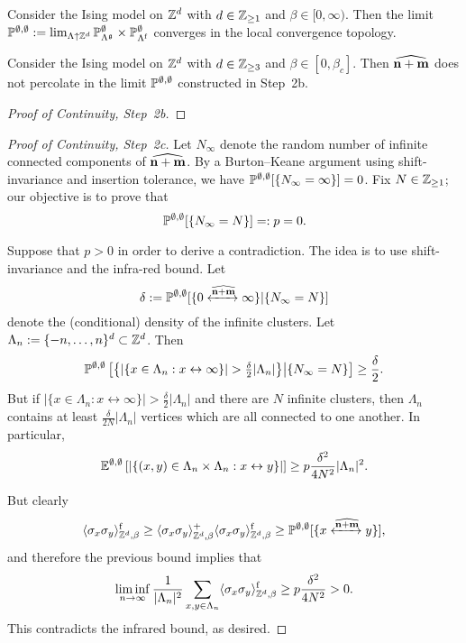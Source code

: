 \begin{lemma}\label{lemma:continuity_step2b}
    Consider the Ising model on $\Z^d$ with $d\in\Z_{\geq 1}$
    and $\beta\in[0,\infty)$.
    Then the limit $\P^{\emptyset,\emptyset}:=
        \lim_{\Lambda\uparrow\Z^d}
        \P_{\Lambda^\frakg}^\emptyset\times\P_{\Lambda^\f}^\emptyset
        $ converges in the local convergence topology.
\end{lemma}

\begin{lemma}\label{lemma:continuity_step2c}
    Consider the Ising model on $\Z^d$ with $d\in\Z_{\geq 3}$
    and $\beta\in[0,\beta_c]$.
    Then $\widehat{\n+\m}$ does not percolate in the limit $\P^{\emptyset,\emptyset}$ constructed
    in Step~2b.
\end{lemma}

\begin{proof}[Proof of Continuity, Step~2b]
\end{proof}

\begin{proof}[Proof of Continuity, Step~2c]
    Let $N_\infty$ denote the random number of infinite connected components of $\widehat{\n+\m}$.
    By a Burton--Keane argument using shift-invariance and insertion tolerance,
    we have $\P^{\emptyset,\emptyset}[\{N_\infty=\infty\}]=0$.
    Fix $N\in\Z_{\geq 1}$; our objective is to prove that
    \[
        \P^{\emptyset,\emptyset}[\{N_\infty= N\}]=:p=0.
    \]

    Suppose that $p>0$ in order to derive a contradiction.
    The idea is to use shift-invariance and the infra-red bound.
    Let
    \[
        \delta:=\P^{\emptyset,\emptyset}[\{0\xleftrightarrow{\widehat{\n+\m}}\infty\}|\{N_\infty= N\}]
    \]
    denote the (conditional) density of the infinite clusters.
    Let $\Lambda_n:=\{-n,\dots,n\}^d\subset\Z^d$.
    Then
    \[
        \P^{\emptyset,\emptyset}\left[\left\{|\{x\in\Lambda_n:x\leftrightarrow\infty\}|>\tfrac{\delta}2|\Lambda_n|\right\}\middle|\{N_\infty= N\}\right]
        \geq
        \frac\delta2.
    \]
    But if $|\{x\in\Lambda_n:x\leftrightarrow\infty\}|>\tfrac{\delta}2|\Lambda_n|$
    and there are $N$ infinite clusters,
    then $\Lambda_n$ contains at least $\tfrac{\delta}{2N}|\Lambda_n|$
    vertices which are all connected to one another.
    In particular,
    \[
        \E^{\emptyset,\emptyset}\left[|\{(x,y)\in\Lambda_n\times\Lambda_n:x\leftrightarrow y\}|\right]
        \geq
        p
        \frac{\delta^2}{4N^2}|\Lambda_n|^2.
    \]

    But clearly
    \[
        \langle\sigma_x\sigma_y\rangle_{\Z^d,\beta}^\f
        \geq
        \langle\sigma_x\sigma_y\rangle_{\Z^d,\beta}^+
        \langle\sigma_x\sigma_y\rangle_{\Z^d,\beta}^\f
        \geq
        \P^{\emptyset,\emptyset}[\{x\xleftrightarrow{\widehat{\n+\m}}y\}],
    \]
    and therefore the previous bound implies that
    \[
        \liminf_{n\to\infty}\frac1{|\Lambda_n|^2}\sum_{x,y\in\Lambda_n}
        \langle\sigma_x\sigma_y\rangle_{\Z^d,\beta}^\f
        \geq p
        \frac{\delta^2}{4N^2}>0.
    \]
    This contradicts the infrared bound, as desired.
\end{proof}


